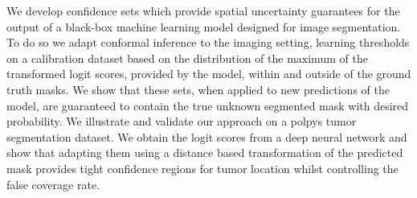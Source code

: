We develop confidence sets which provide spatial uncertainty guarantees for the output of a black-box machine learning model designed for image segmentation. To do so we adapt conformal inference to the imaging setting, learning thresholds  on a calibration dataset based on the distribution of the maximum of the transformed logit scores, provided by the model, within and outside of the ground truth masks. We show that these sets, when applied to new predictions of the model, are guaranteed to contain the true unknown segmented mask with desired probability. We illustrate and validate our approach on a polpys tumor segmentation dataset. We obtain the logit scores from a deep neural network and show that adapting them using a distance based transformation of the predicted mask provides tight confidence regions for tumor location whilst controlling the false coverage rate. 